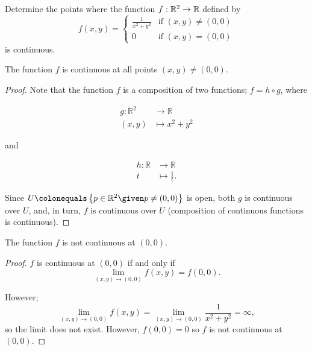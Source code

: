 \begin{problem}
  Determine the points where the function $f : \mathbb{R}^2 \to \mathbb{R}$ defined by
  \[
    f(x, y) = \begin{cases}
      \frac{1}{x^2 + y^2} & \text{if } (x, y) \neq (0, 0) \\
      0 & \text{if } (x, y) = (0, 0)
    \end{cases}
  \]
  is continuous.
\end{problem}

\begin{answer}

  \begin{claim}
    The function $f$ is continuous at all points $(x, y) \neq (0, 0)$.

    \begin{proof}
      Note that the function $f$ is a composition of two functions;
      $f = h \circ g$, where

      \begin{minipage}{0.4\textwidth}
        \begin{align*}
          g : \mathbb{R}^2 &\to \mathbb{R} \\
          (x, y) &\mapsto x^2 + y^2
        \end{align*}
      \end{minipage}%
      \begin{minipage}{0.1\textwidth}
        and
      \end{minipage}%
      \begin{minipage}{0.1\textwidth}
        \begin{align*}
          h : \mathbb{R} &\to \mathbb{R} \\
          t &\mapsto \frac{1}{t}.
        \end{align*}
      \end{minipage}

      \step
      Since $U \colonequals \set{ p \in \R^2 \given p \neq (0, 0) }$ is open,
      both $g$ is continuous over $U$, and, in turn, $f$ is continuous over $U$
      (composition of continuous functions is continuous).
    \end{proof}
  \end{claim}

  \begin{claim}
    The function $f$ is not continuous at $(0, 0)$.

    \begin{proof}
      $f$ is continuous at $(0, 0)$ if and only if
      \[
        \lim_{(x, y) \to (0, 0)} f(x, y) = f(0, 0).
      \]

      \step
      However;
      \[
        \lim_{(x, y) \to (0, 0)} f(x, y)
        = \lim_{(x, y) \to (0, 0)} \frac{1}{x^2 + y^2}
        = \infty,
      \]
      so the limit does not exist.
      However, $f(0, 0) = 0$
      so $f$ is not continuous at $(0, 0)$.
    \end{proof}
  \end{claim}
\end{answer}
